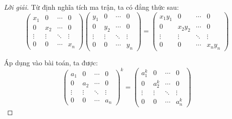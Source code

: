 \begin{proof}[Lời giải]
    Từ định nghĩa tích ma trận, ta có đẳng thức sau:
    \[
        \begin{pmatrix}
            x_{1}  & 0      & \cdots & 0      \\
            0      & x_{2}  & \cdots & 0      \\
            \vdots & \vdots & \ddots & \vdots \\
            0      & 0      & \cdots & x_{n}
        \end{pmatrix}
        \begin{pmatrix}
            y_{1}  & 0      & \cdots & 0      \\
            0      & y_{2}  & \cdots & 0      \\
            \vdots & \vdots & \ddots & \vdots \\
            0      & 0      & \cdots & y_{n}
        \end{pmatrix}
        =
        \begin{pmatrix}
            x_{1}y_{1} & 0          & \cdots & 0          \\
            0          & x_{2}y_{2} & \cdots & 0          \\
            \vdots     & \vdots     & \ddots & \vdots     \\
            0          & 0          & \cdots & x_{n}y_{n}
        \end{pmatrix}
    \]
    
    Áp dụng vào bài toán, ta được:
    \[
        {\begin{pmatrix}
            a_{1}  & 0      & \cdots & 0      \\
            0      & a_{2}  & \cdots & 0      \\
            \vdots & \vdots & \ddots & \vdots \\
            0      & 0      & \cdots & a_{n}
        \end{pmatrix}}^{k}
        =
        \begin{pmatrix}
            a^{k}_{1} & 0         & \cdots & 0         \\
            0         & a^{k}_{2} & \cdots & 0         \\
            \vdots    & \vdots    & \ddots & \vdots    \\
            0         & 0         & \cdots & a^{k}_{n}
        \end{pmatrix}
    \]
\end{proof}

